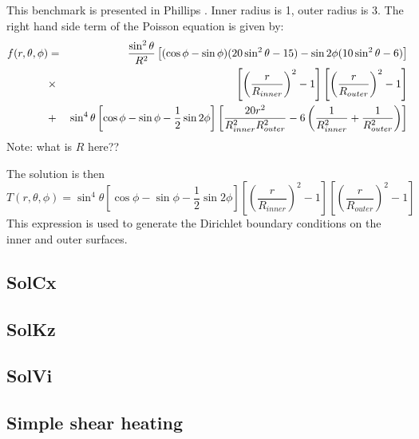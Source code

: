 This benchmark is presented in Phillips \etal \cite{phdo19}. 
Inner radius is 1, outer radius is 3.
The right hand side term of the Poisson equation is given by:
\begin{eqnarray}
f(r,\theta,\phi)&=&
\frac{\sin^2\theta }{R^2} 
\left[
(\cos\phi-\sin\phi)(20\sin^2\theta -15) -\sin 2\phi (10\sin^2 \theta -6)
\right] \nonumber\\
&\times & \left[ \left(\frac{r}{R_{inner}}\right)^2 -1  \right]
\left[ \left(\frac{r}{R_{outer}}\right)^2 -1  \right] \nonumber\\
&+&\sin^4 \theta
\left[ \cos\phi -\sin\phi -\frac12 \sin 2\phi \right]
\left[
\frac{20r^2}{R_{inner}^2R_{outer}^2} -6 \left( \frac{1}{R_{inner}^2}+\frac{1}{R_{outer}^2}  \right)
\right]
\end{eqnarray}
Note: what is $R$ here??

The solution is then 
\[
T(r,\theta,\phi) = \sin^4 \theta \left[ \cos\phi -\sin\phi -\frac12 \sin 2\phi \right]
\left[ \left(\frac{r}{R_{inner}}\right)^2 -1  \right]
\left[ \left(\frac{r}{R_{outer}}\right)^2 -1  \right]
\]
This expression is used to generate the Dirichlet boundary conditions on the inner and outer surfaces.


\subsection{SolCx}\label{ss:solcx} 


\subsection{SolKz} \label{ss:solkz} 


\subsection{SolVi} \label{ss:solvi} 





\subsection{Simple shear heating} \label{ss:shearheating} 





